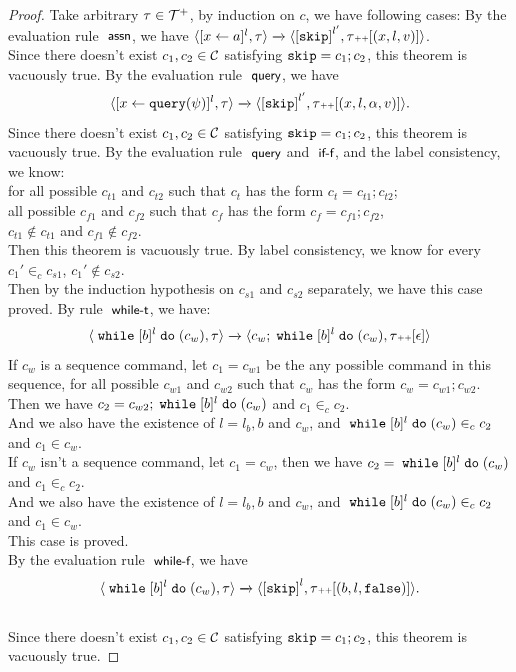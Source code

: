 \begin{proof}
	Take arbitrary $\mathtt{\tau} \in \mathcal{T}^{+}$, by induction on $c$, we have following cases:
		By the evaluation rule $\textsf{\small{ assn}}$, we have
		$
		{
		\config{[\assign{{x}}{\aexpr}]^{l},  \trace } 
		\xrightarrow{} 
		\config{\clabel{\eskip}^{l'}, \trace \tracecat [({x}, l, v) ]}
		}$.
		\\
		Since there doesn't exist $c_1, c_2 \in \mathcal{C}$ satisfying $\mathtt{skip} = c_1; c_2$, this theorem is vacuously true.
		By the evaluation rule $\textsf{\small{ query}}$, we have
		$$
		{
		\config{[\assign{{x}}{\query(\qexpr)}]^{l},  \trace } 
		\xrightarrow{} 
		\config{\clabel{\eskip}^{l'}, \trace \tracecat [({x}, l, \qval, v) ]}
		}.$$
		Since there doesn't exist $c_1, c_2 \in \mathcal{C}$ satisfying $\mathtt{skip} = c_1; c_2$, this theorem is vacuously true.
		By the evaluation rule $\textsf{\small{ query}}$ and $\textsf{\small{ if-f}}$, and the label consistency, we know:
		\\
		for all possible $c_{t1}$ and $c_{t2}$ 
		such that $c_t$ has the form $c_t = c_{t1};c_{t2}$;
		\\
		all possible $c_{f1}$ and $c_{f2}$ 
		such that $c_f$ has the form $c_f = c_{f1};c_{f2}$,
		\\
		$c_{t1} \notin c_{t1}$ and $c_{f1} \notin c_{f2}$.
		\\
		Then this theorem is vacuously true.
		By label consistency, we know for every $c_1' \in_c c_{s1}$, $c_1' \notin c_{s2}$.
		\\
		Then by the induction hypothesis on $c_{s1}$ and $c_{s2}$ separately, we have this case proved.
		By rule $\textsf{\small{ while-t}}$, we have:
		\[
			\langle {\;\ensuremath{\mathtt{while}}\;[b]^{l} \;\ensuremath{\mathtt{do}}\;(c_w), \ensuremath{\mathtt{\tau}}} \rangle
			\xrightarrow{} 
			\langle {
			c_w; \;\ensuremath{\mathtt{while}}\;[b]^{l} \;\ensuremath{\mathtt{do}}\;(c_w),
			\ensuremath{\mathtt{\tau}}{\scriptscriptstyle ++}[\ensuremath{\mathtt{\epsilon}}]} \rangle
		\]
		If $c_w$ is a sequence command,
		let $c_1 = c_{w1}$ be the any possible command in this sequence, for all possible $c_{w1}$ and $c_{w2}$ 
		such that $c_w$ has the form $c_w = c_{w1};c_{w2}$.
		\\
		Then we have $c_2 = c_{w2};\;\mathtt{while}\; [b]^{l} \;\mathtt{do}\; (c_w)$ and $c_1 \in_c c_2$.
		\\
		And we also have the existence of $l = l_b, b$ and $c_w$, and $\;\mathtt{while}\; [b]^{l} \;\mathtt{do}\; (c_w) \in_c c_2$ and  $c_1 \in c_w$.
		\\
		If $c_w$ isn't a sequence command, let $c_1 = c_w$, then we have $c_2 = \;\mathtt{while}\; [b]^{l} \;\mathtt{do}\; (c_w)$ 
		and $c_1 \in_c c_2$.
		\\
		And we also have the existence of $l = l_b, b$ and $c_w$, and $\;\mathtt{while}\; [b]^{l} \;\mathtt{do}\; (c_w) \in_c c_2$ and  $c_1 \in c_w$.
		\\
		This case is proved.
		\\
		By the evaluation rule $\textsf{\small{ while-f}}$, we have
		$$
		{
			\config{{\ewhile [b]^{l} \edo (c_w), \trace}}
			\xrightarrow{} 
			\config{{
			\clabel{\eskip}^l ,
			\trace \tracecat [(b, l, \efalse)]}}.
		}$$
		\\
		Since there doesn't exist $c_1, c_2 \in \mathcal{C}$ satisfying $\mathtt{skip} = c_1; c_2$, this theorem is vacuously true.
	\end{proof}
